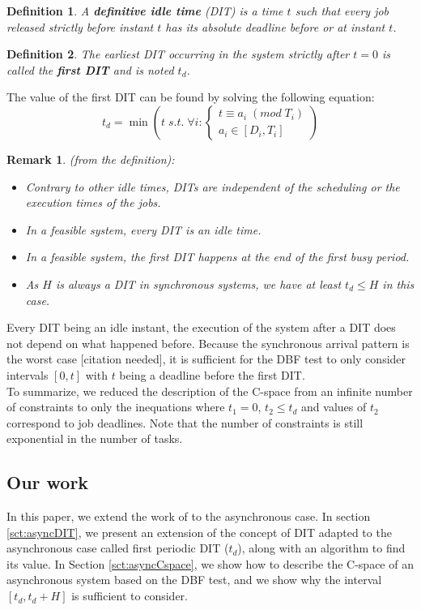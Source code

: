 \documentclass[times, 10pt,twocolumn, a4paper]{article}
\newtheorem{definition}{Definition}
\newtheorem{remark}{Remark}
\begin{document}
	\begin{definition}
		A \textbf{definitive idle time} (DIT) is a time $t$ such that every job
		released strictly before instant $t$ has its absolute deadline before or at instant $t$.
	\end{definition}
	
	\begin{definition}
		The earliest DIT occurring in the system strictly after $t=0$ is called the
		\textbf{first DIT} and is noted $t_d$.
	\end{definition}

	The value of the first DIT can be found by solving the following equation:
	\[
		t_d = \min 
		\left( t \; s.t. \; \forall i:
			\left\{
				\begin{array}{c}
					t \equiv a_i \; (mod \; T_i) \\
					a_i \in [D_i, T_i]
				\end{array}
			\right.
		\right)
	\]

	\begin{remark} (from the definition):
		\begin{itemize}
			\item Contrary to other idle times, DITs are independent of the
			scheduling or the execution times of the jobs.
			\item In a feasible system, every DIT is an idle time.
			\item In a feasible system, the first DIT happens at the end of the
			first busy period.
			\item As $H$ is always a DIT in synchronous systems, we have at least $t_d
			\leqslant H$ in this case.
		\end{itemize}
	\end{remark}

	Every DIT being an idle instant, the execution of the system after a DIT does
	not depend on what happened before. Because the synchronous arrival pattern is
	the worst case [citation needed], it is sufficient for the DBF test to only
	consider intervals $[0, t]$ with $t$ being a deadline before the first DIT.\\
	
	To summarize, we reduced the description of the C-space from an infinite number
	of constraints to only the inequations where $t_1 = 0$, $t_2 \leqslant t_d$ and
	values of $t_2$ correspond to job deadlines. Note that the number of
	constraints is still exponential in the number of tasks.

	\subsection{Our work}
		In this paper, we extend the work of \cite{george2009characterization} to the
		asynchronous case. In section \ref{sct:asyncDIT}, we present an extension of
		the concept of DIT adapted to the asynchronous case called first periodic DIT
		($t_d$), along with an algorithm to find its value. In Section
		\ref{sct:asyncCspace}, we show how to describe the C-space of an asynchronous
		system based on the DBF test, and we show why the interval $[t_d, t_d + H]$ is
		sufficient to consider.
\end{document}
